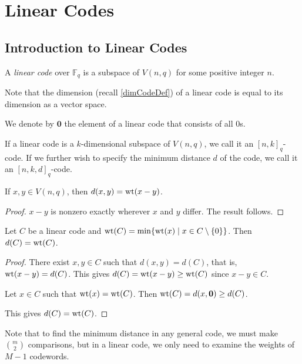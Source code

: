 \section{Linear Codes}

\subsection{Introduction to Linear Codes}

\begin{definition}
    A \textit{linear code} over $\mathbb{F}_q$ is a subspace of $V(n,q)$ for some positive integer $n$.
\end{definition}

Note that the dimension (recall \ref{dimCodeDef}) of a linear code is equal to its dimension as a vector space.

We denote by $\textbf{0}$ the element of a linear code that consists of all $0$s.

If a linear code is a $k$-dimensional subspace of $V(n,q)$, we call it an $[n,k]_q$-code. If we further wish to specify the minimum distance $d$ of the code, we call it an $[n,k,d]_q$-code.

\begin{lemma}
    If $x,y\in V(n,q)$, then $d(x,y)=\operatorname{wt}(x-y)$.
\end{lemma}
\begin{proof}
    $x-y$ is nonzero exactly wherever $x$ and $y$ differ. The result follows.
\end{proof}

\begin{theorem}
\label{minDistIsMinWeight}
    Let $C$ be a linear code and $\operatorname{wt}(C)=\min\{\operatorname{wt}(x)\mid x\in C\setminus\{0\}\}$. Then $d(C)=\operatorname{wt}(C)$.
\end{theorem}
\begin{proof}
    There exist $x,y\in C$ such that $d(x,y)=d(C)$, that is, $\operatorname{wt}(x-y)=d(C)$. This gives $d(C)=\operatorname{wt}(x-y)\geq \operatorname{wt}(C)$ since $x-y\in C$.
    
    Let $x\in C$ such that $\operatorname{wt}(x)=\operatorname{wt}(C)$. Then $\operatorname{wt}(C)=d(x,\textbf{0})\geq d(C)$.
    
    This gives $d(C)=\operatorname{wt}(C)$.
\end{proof}

Note that to find the minimum distance in any general code, we must make $\binom{m}{2}$ comparisons, but in a linear code, we only need to examine the weights of $M-1$ codewords.

    
